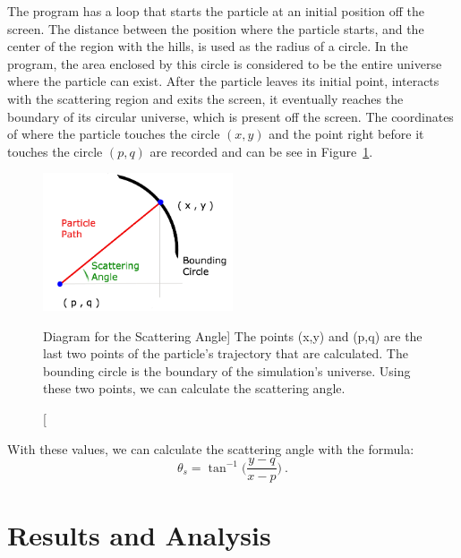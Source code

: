 \documentclass[12pt]{article} %
\begin{document}
The program has a loop that starts the particle at an initial position off the screen. The distance between the position where the particle starts, and the center of the region with the hills, is used as the radius of a circle. In the program, the area enclosed by this circle is considered to be the entire universe where the particle can exist. After the particle leaves its initial point, interacts with the scattering region and exits the screen, it eventually reaches the boundary of its circular universe, which is present off the screen. The coordinates of where the particle touches the circle $(x,y)$ and the point right before it touches the circle $(p,q)$ are recorded and can be see in Figure~\ref{fig:scatteringAngleCalculation}. \\ 


\begin{figure}[h]
	\centering
	\includegraphics[width=0.5\textwidth]{Diagram.png}
	\caption
	[Diagram for the Scattering Angle]
	{The points (x,y) and (p,q) are the last two points of the particle's trajectory that are calculated. The bounding circle is the boundary of the simulation's universe. Using these two points, we can calculate the scattering angle.}
	\label{fig:scatteringAngleCalculation}
\end{figure}

With these values, we can calculate the scattering angle with the formula: 
$$ \theta_s = \tan ^{-1} \bigg(\frac{y - q}{x - p} \bigg) \ . $$




\section{Results and Analysis}  \label{Sec5:ResultsAndAnalysis}%
\end{document}
